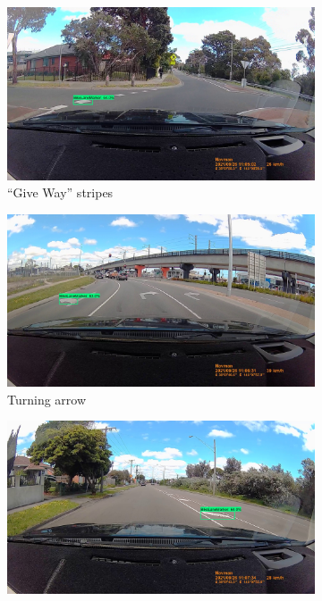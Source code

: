 \documentclass[11pt,twoside]{report}
\begin{document}
\begin{figure}[h]
\centering
\begin{subfigure}{0.3\textwidth}
	\includegraphics[width=\textwidth]{f005_false_positive_give_way.jpg}
	\caption{``Give Way'' stripes}
\end{subfigure}
\hfill
\begin{subfigure}{0.3\textwidth}
	\includegraphics[width=\textwidth]{f005_false_positive_arrow.jpg}
	\caption{Turning arrow}
\end{subfigure}
\hfill
\begin{subfigure}{0.3\textwidth}
	\includegraphics[width=\textwidth]{f005_false_positive_island.jpg}

\end{subfigure}
\end{figure}
\end{document}
